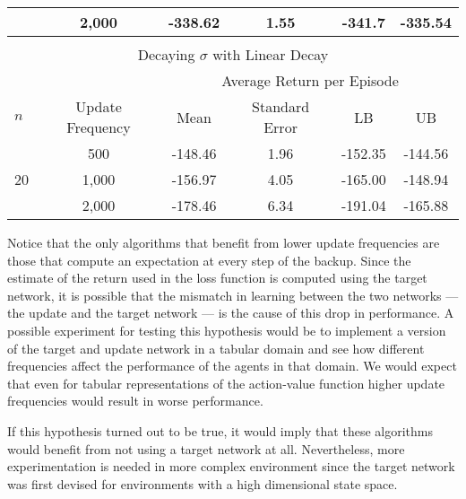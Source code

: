 \begin{table}[htp]
\begin{center}
\begin{tabular}{lccccc}
    & 2,000     & -338.62	& 1.55	& -341.7	& -335.54   \\
\bottomrule
&&&& \\
\toprule
\multicolumn{6}{c}{Decaying $\sigma$ with Linear Decay} \\
\bottomrule
&& \multicolumn{4}{c}{Average Return per Episode} \\
\cmidrule{3-6}
$n$ & Update Frequency & Mean & Standard Error & LB & UB \\
\midrule
    & 500       & -148.46	& 1.96	& -152.35	& -144.56   \\
20  & 1,000     & -156.97	& 4.05	& -165.00	& -148.94   \\
    & 2,000     & -178.46	& 6.34	& -191.04	& -165.88   \\
\bottomrule
\end{tabular}
\end{center}
\end{table}

Notice that the only algorithms that benefit from lower update frequencies are those that compute an expectation at every step of the backup.
Since the estimate of the return used in the loss function is computed using the target network, it is possible that the mismatch in learning between the two networks --- the update and the target network --- is the cause of this drop in performance.
A possible experiment for testing this hypothesis would be to implement a version of the target and update network in a tabular domain and see how different frequencies affect the performance of the agents in that domain.
We would expect that even for tabular representations of the action-value function higher update frequencies would result in worse performance.

If this hypothesis turned out to be true, it would imply that these algorithms would benefit from not using a target network at all.
Nevertheless, more experimentation is needed in more complex environment since the target network was first devised for environments with a high dimensional state space.


